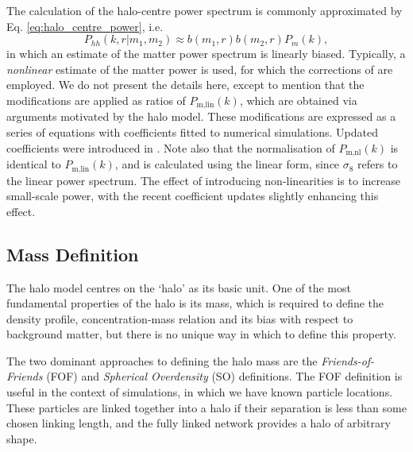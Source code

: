 \documentclass[5p,aas_macros]{elsarticle}
\newcommand{\bd}[1]{\textcolor{purple}{\textbf{[BD: #1]}}}
\begin{document}
The calculation of the halo-centre power spectrum is commonly approximated by Eq. \ref{eq:halo_centre_power}, i.e.
\begin{equation*}
    P_{hh}(k,r|m_1,m_2) \approx b(m_1,r)b(m_2,r)P_m(k),
\end{equation*}
 in which an estimate of the matter power spectrum is linearly biased. Typically, a \textit{nonlinear} estimate of the matter power is used, for which the corrections of \citet[][hereafter \textsc{halofit}]{Smith2003} are employed. We do not present the details here, except to mention that the modifications are applied as ratios of $P_\text{m,lin}(k)$, which are obtained via arguments motivated by the halo model. These modifications are expressed as a series of equations with coefficients fitted to numerical simulations. Updated coefficients were introduced in \citet{Takahashi2012}. Note also that the normalisation of $P_\text{m,nl}(k)$ is ident\-ical to $P_\text{m,lin}(k)$, and is calculated using the linear form, since $\sigma_8$ refers to the linear power spectrum. The effect of introducing non-linearities is to increase small-scale power, with the recent coefficient updates slightly enhancing this effect.

\subsection{Mass Definition}
\label{sec:theory:massdef}
The halo model centres on the `halo' as its basic unit.
One of the most fundamental properties of the halo is its mass, which is required to define the density profile, concentration-mass relation and its bias with respect to background matter, but there is no unique way in which to define this property. 

The two dominant approaches to defining the halo mass are the \textit{Friends-of-Friends} (FOF) and \textit{Spherical Overdensity} (SO) definitions. 
The FOF definition is useful in the context of simulations, in which we have known particle locations. These particles are linked together into a halo if their separation is less than some chosen linking length, and the fully linked network provides a halo of arbitrary shape.
\end{document}
